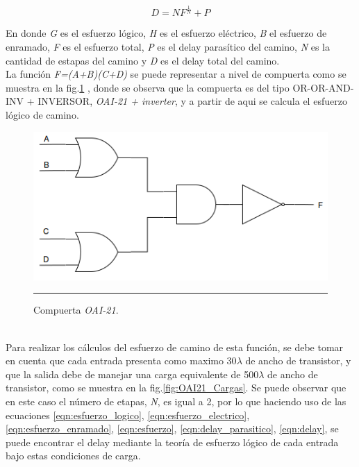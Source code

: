 \documentclass[12pt,a4paper]{article} %
\begin{document}
\begin{equation}\label{eqn:delay}
D = NF^{\frac{1}{N}} + P
\end{equation}

En donde \textit{G} es el esfuerzo lógico, \textit{H} es el esfuerzo eléctrico, \textit{B} el esfuerzo de enramado, \textit{F} es el esfuerzo total, \textit{P} es el delay parasítico del camino, \textit{N} es la cantidad de estapas del camino y \textit{D} es el delay total del camino.\\

La función \textit{F=(A+B)(C+D)} se puede representar a nivel de compuerta como se muestra en la fig.\ref{fig:OAI21} , donde se observa que la compuerta es del tipo OR-OR-AND-INV + INVERSOR, \textit{OAI-21 + inverter}, y a partir de aqui se calcula el esfuerzo lógico de camino.\\

\begin{figure}[htbp]
  \centering
    \includegraphics[scale=0.5]{./OAI21.png}
    \rule{35em}{0.5pt}
  \caption[IdealvsSim]{Compuerta \textit{OAI-21}.}
  \label{fig:OAI21}
\end{figure}\\

Para realizar los cálculos del esfuerzo de camino de esta función, se debe tomar en cuenta que cada entrada presenta como maximo 30$\lambda$ de ancho de transistor, y que la salida debe de manejar una carga equivalente de 500$\lambda$ de ancho de transistor, como se muestra en la fig.\ref{fig:OAI21_Cargas}. Se puede observar que en este caso el número de etapas, \textit{N}, es igual a 2, por lo que haciendo uso de las ecuaciones \ref{eqn:esfuerzo_logico}, \ref{eqn:esfuerzo_electrico}, \ref{eqn:esfuerzo_enramado}, \ref{eqn:esfuerzo}, \ref{eqn:delay_parasitico}, \ref{eqn:delay}, se puede encontrar el delay mediante la teoría de esfuerzo lógico de cada entrada bajo estas condiciones de carga.\\
\end{document}
